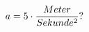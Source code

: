 \documentclass[preview]{standalone}
\begin{document}
\begin{align*}
\special{dvisvgm:raw <g id='unique000'>}a = 5 \cdot \frac{Meter}{Sekunde^{2}} ?\special{dvisvgm:raw </g>}
\end{align*}
\end{document}
